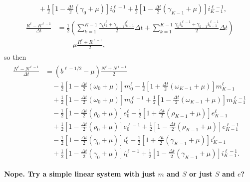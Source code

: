 \documentclass{jpmarticle}
\let\subequationsorig\subequations%
\let\endsubequationsorig\endsubequations%
\renewenvironment{subequations}{
  \subequationsorig
  \renewcommand{\theequation}{\theparentequation.\arabic{equation}}
}{
  \endsubequationsorig
}
\begin{document}
\begin{subequations}
\begin{align}
\begin{split}
      \\ & \quad {}
      + \frac{1}{2} \left[
        1 - \frac{\Delta t}{2} (\gamma_0 + \mu)
      \right] i_0^{\ell - 1}
      + \frac{1}{2} \left[
        1 - \frac{\Delta t}{2} (\gamma_{K - 1} + \mu)
      \right] i_{K - 1}^{\ell - 1},
    \end{split}
    \\
    \begin{split}
      \frac{R^{\ell} - R^{\ell - 1}}{\Delta t} &=
      \frac{1}{2} \left(
      \sum_{k = 1}^{K - 1}
      \frac{\gamma_k i_k^{\ell} + \gamma_{k - 1} i_{k - 1}^{\ell}}{2}
      \Delta t
      + \sum_{k = 1}^{K - 1}
      \frac{\gamma_k i_k^{\ell - 1} + \gamma_{k - 1} i_{k - 1}^{\ell - 1}}{2}
      \Delta t
      \right)
      \\ & \quad {}
      - \mu \frac{R^{\ell} + R^{\ell - 1}}{2},
    \end{split}
  \end{align}
  so then
  \begin{align}
    \begin{split}
      \frac{N^{\ell} - N^{\ell - 1}}{\Delta t}
      &=
      \left(b^{\ell - 1 / 2} - \mu\right)
      \frac{N^{\ell} + N^{\ell - 1}}{2}
      \\ & \quad {}
      - \frac{1}{2} \left[
        1 - \frac{\Delta t}{2} (\omega_0 + \mu)
      \right] m_0^{\ell}
      - \frac{1}{2} \left[
        1 + \frac{\Delta t}{2} (\omega_{K - 1} + \mu)
      \right] m_{K - 1}^{\ell}
      \\ & \quad {}
      + \frac{1}{2} \left[
        1 - \frac{\Delta t}{2} (\omega_0 + \mu)
      \right] m_0^{\ell - 1}
      + \frac{1}{2} \left[
        1 - \frac{\Delta t}{2} (\omega_{K - 1} + \mu)
      \right] m_{K - 1}^{\ell - 1}
      \\ & \quad {}
      - \frac{1}{2} \left[
        1 - \frac{\Delta t}{2} (\rho_0 + \mu)
      \right] e_0^{\ell}
      - \frac{1}{2} \left[
        1 + \frac{\Delta t}{2} (\rho_{K - 1} + \mu)
      \right] e_{K - 1}^{\ell}
      \\ & \quad {}
      + \frac{1}{2} \left[
        1 - \frac{\Delta t}{2} (\rho_0 + \mu)
      \right] e_0^{\ell - 1}
      + \frac{1}{2} \left[
        1 - \frac{\Delta t}{2} (\rho_{K - 1} + \mu)
      \right] e_{K - 1}^{\ell - 1}
      \\ & \quad {}
      - \frac{1}{2} \left[
        1 - \frac{\Delta t}{2} (\gamma_0 + \mu)
      \right] i_0^{\ell}
      - \frac{1}{2} \left[
        1 + \frac{\Delta t}{2} (\gamma_{K - 1} + \mu)
      \right] i_{K - 1}^{\ell}
      \\ & \quad {}
      + \frac{1}{2} \left[
        1 - \frac{\Delta t}{2} (\gamma_0 + \mu)
      \right] i_0^{\ell - 1}
      + \frac{1}{2} \left[
        1 - \frac{\Delta t}{2} (\gamma_{K - 1} + \mu)
      \right] i_{K - 1}^{\ell - 1}.
    \end{split}
  \end{align}
\end{subequations}
\textbf{Nope. Try a simple linear system with just $m$
  and $S$ or just $S$ and $e$?}
\end{document}
